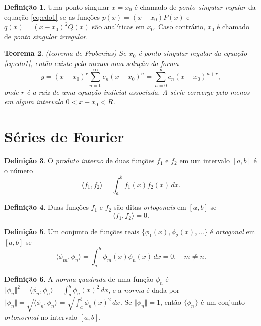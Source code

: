 \documentclass[12pt]{article}
\theoremstyle{plain}
\newtheorem{thm}{Teorema}[section]
\theoremstyle{definition}
\newtheorem{defn}[thm]{Definição}
\theoremstyle{remark}
\begin{document}
\begin{defn}
    Uma ponto singular \(x=x_0\) é chamado de \emph{ponto singular regular} da equação \eqref{eq:edo1} se as funções \(p(x)=(x-x_0)P(x)\) e \(q(x)=(x-x_0)^2Q(x)\) são analíticas em \(x_0\). Caso contrário, \(x_0\) é chamado de \emph{ponto singular irregular}.
\end{defn}

\begin{thm} (teorema de Frobenius)
    Se \(x_0\) é ponto singular regular da equação \eqref{eq:edo1}, então existe pelo menos uma solução da forma
    \begin{equation}
        y = (x - x_0)^r \sum_{n=0}^{\infty} c_n (x - x_0)^n = \sum_{n=0}^{\infty} c_n (x - x_0)^{n+r},
    \end{equation}
    \noindent onde \(r\) é a raiz de uma equação indicial associada. A série converge pelo menos em algum intervalo \(0<x-x_0<R\).
\end{thm}

\section{Séries de Fourier}

\begin{defn} 
    O \emph{produto interno} de duas funções \(f_1\) e \(f_2\) em um intervalo \([a,b]\) é o número
    \begin{equation}
        \langle f_1, f_2 \rangle = \int_a^b f_1(x)f_2(x) \, dx.
    \end{equation}
\end{defn}

\begin{defn}
    Duas funções \(f_1\) e \(f_2\) são ditas \emph{ortogonais} em \([a,b]\) se
    \begin{equation}
        \langle f_1, f_2 \rangle = 0.
    \end{equation}
\end{defn}

\begin{defn}
    Um conjunto de funções reais \(\{\phi_1(x), \phi_2(x), \ldots\}\) é \emph{ortogonal} em \([a,b]\) se
    \begin{equation}
        \langle \phi_m, \phi_n \rangle = \int_a^b \phi_m(x)\phi_n(x) \, dx = 0, \quad m \neq n.
    \end{equation}
\end{defn}

\begin{defn}
    A \emph{norma quadrada} de uma função \(\phi_n\) é \(\Vert \phi _n \Vert^2 = \langle \phi_n, \phi_n \rangle = \int_a^b \phi_n(x)^2 \, dx\), e a \emph{norma} é dada por \(\Vert \phi_n \Vert = \sqrt{\langle \phi_n, \phi_n \rangle} = \sqrt{\int_a^b \phi_n(x)^2 \, dx}\). Se \(\Vert \phi_n \Vert = 1\), então \(\{\phi_n\}\) é um conjunto \emph{ortonormal} no intervalo \([a,b]\).
\end{defn}
\end{document}

